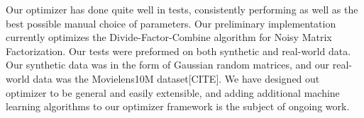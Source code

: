 Our optimizer has done quite well in tests, consistently performing as 
well as the best possible manual choice of parameters. Our preliminary 
implementation currently optimizes the Divide-Factor-Combine algorithm 
for Noisy Matrix Factorization. Our tests were preformed on both synthetic 
and real-world data. Our synthetic data was in the form of Gaussian 
random matrices, and our real-world data was the Movielens10M 
dataset[CITE]. We have designed out optimizer to be general and easily 
extensible, and adding additional machine learning algorithms to our 
optimizer framework is the subject of ongoing work.
